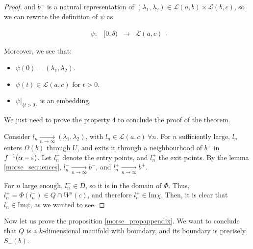 \begin{proof}
and $b^-$ is a natural representation of $(\lambda_1,\lambda_2) \in \mathcal{L}(a,b) \times \mathcal{L}(b,c)$, so we can rewrite the definition of $\psi$ as

\[\begin{array}{rccc} \psi : & [0,\delta) & \longrightarrow & \overline{\mathcal{L}}(a,c) \end{array} .\]

Moreover, we see that:

\begin{itemize}
	\item $\psi(0) = (\lambda_1,\lambda_2)$.
	\item $\psi(t) \in \mathcal{L}(a,c)$ for $t > 0$.
	\item $\left. \psi \right|_{\{t > 0\}}$ is an embedding.
\end{itemize}

We just need to prove the property 4 to conclude the proof of the theorem.

Consider $l_n \xrightarrow[n \rightarrow \infty]{} (\lambda_1,\lambda_2)$, with $l_n \in \mathcal{L}(a,c) \ \forall n$. For $n$ sufficiently large, $l_n$ enters $\Omega(b)$ through $U$, and exits it through a neighbourhood of $b^+$ in $f^{-1}(\alpha-\varepsilon)$. Let $l_n^-$ denote the entry points, and $l_n^+$ the exit points. By the lemma \ref{morse_sequences}, $l_n^- \xrightarrow[n \rightarrow \infty]{} b^-$, and $l_n^+ \xrightarrow[n \rightarrow \infty]{} b^+$.

For $n$ large enough, $l_n^- \in D$, so it is in the domain of $\Phi$. Thus, $l_n^+ = \Phi(l_n^-) \in Q \cap W^s(c)$, and therefore $l_n^+ \in \text{Im} \chi$. Then, it is clear that $l_n \in \text{Im} \psi$, as we wanted to see.
\end{proof}

Now let us prove the proposition \ref{morse_propappendix}. We want to conclude that $Q$ is a $k$-dimensional manifold with boundary, and its boundary is precisely $S_-(b)$.

